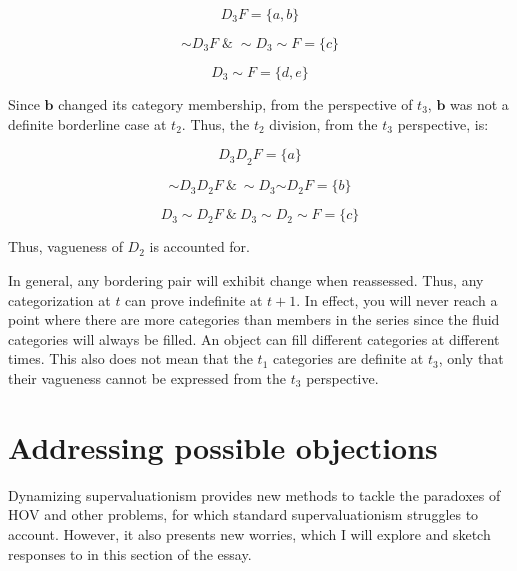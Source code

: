 \[D_{3}F = \{ a,b\}\]

\[{\sim}D_{3}F \; \& \; {\sim}D_{3}{\sim}F = \{ c\}\]

\[D_{3}{\sim} F = \{ d,e\}\]

\begin{center}
  \end{center}
Since $\mathbf{b}$ changed its category membership, from the perspective
of \(t_{3}\), $\mathbf{b}$ was not a definite borderline case at
\(t_{2}\). Thus, the \(t_{2}\) division, from the \(t_{3}\) perspective,
is:

\[{D_{3}D}_{2}F = \{ a\}\]

\[\sim D_{3}D_{2}F\ \&\ \sim D_{3}{\sim D}_{2}F = \{ b\}\]

\[D_{3}\sim D_{2}F\ \&\ D_{3}\sim D_{2}\sim F = \{ c\}\]

\begin{center}
  \end{center}
Thus, vagueness of \(D_{2}\) is accounted for.

In general, any bordering pair will exhibit change when reassessed.
Thus, any categorization at $t$ can prove indefinite at $t+1$.
In effect, you will never reach a point where there are more categories
than members in the series since the fluid categories will always be
filled. An object can fill different categories at different times. This
also does not mean that the \(t_{1}\) categories are definite at
\(t_{3}\), only that their vagueness cannot be expressed from the
\(t_{3}\) perspective.

\section{Addressing possible objections}

Dynamizing supervaluationism provides new methods to tackle the
paradoxes of HOV and other problems, for which standard
supervaluationism struggles to account. However, it also presents new
worries, which I will explore and sketch responses to in this section of
the essay.

